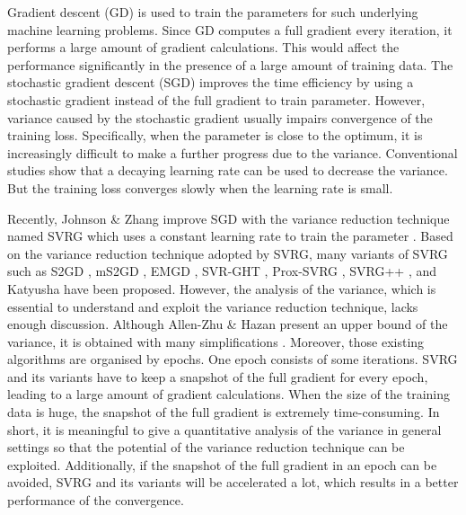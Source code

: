 \documentclass[letterpaper]{article}
\begin{document}
Gradient descent (GD) is used to train the parameters for such underlying machine learning problems. Since GD computes a full gradient every iteration, it performs a large amount of gradient calculations.  This would affect the performance significantly in the presence of a large amount of training data. The stochastic gradient descent (SGD) improves the time efficiency by using a stochastic gradient instead of the full gradient to train parameter. However, variance caused by the stochastic gradient usually impairs convergence of the training loss. Specifically, when the parameter is close to the optimum, it is increasingly difficult to make a further progress  due to the variance. Conventional studies show that a decaying learning rate can be used to decrease the variance. But the training loss converges slowly when the learning rate is small. 

Recently, Johnson \& Zhang improve SGD with the variance reduction technique named SVRG which uses a constant learning rate to train the parameter \cite{Johnson:9MAvkbgy}.  Based on the variance reduction technique adopted by SVRG, many variants of SVRG such as S2GD \cite{Richtarik:2013te}, mS2GD \cite{Liu:2015bx}, EMGD \cite{Zhang2013Linear}, SVR-GHT \cite{Li:2016vh}, Prox-SVRG \cite{Xiao:2014vw}, SVRG++ \cite{Allen2015Improved}, and Katyusha \cite{Allenzhu2016Katyusha} have been proposed. However, the analysis of the variance, which is essential to understand and exploit the variance reduction technique, lacks enough discussion. Although Allen-Zhu \& Hazan  present an upper bound of the variance, it is obtained with many  simplifications \cite{AllenZhu:2016up}. Moreover, those existing algorithms are organised by epochs. One epoch consists of some iterations. SVRG and its variants have to keep a snapshot of the full gradient for every epoch, leading to a large amount of gradient calculations. When the size of the training data is huge, the snapshot of the full gradient is extremely time-consuming.   In short, it is meaningful to give a quantitative analysis  of the variance in general settings so that the potential of the variance reduction technique can be exploited.  Additionally, if the snapshot of the full gradient in an epoch can be avoided, SVRG and its variants will be accelerated a lot, which results in a better performance of the convergence.
 
\end{document}
